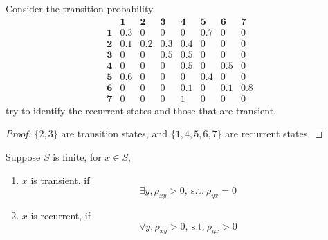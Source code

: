 \begin{example}
	Consider the transition probability,
	\begin{equation*}
		\begin{array}{cccccccc}
			           & \mathbf{1} & \mathbf{2} & \mathbf{3} & \mathbf{4} & \mathbf{5} & \mathbf{6} & \mathbf{7} \\
			\mathbf{1} & 0.3        & 0          & 0          & 0          & 0.7        & 0          & 0          \\
			\mathbf{2} & 0.1        & 0.2        & 0.3        & 0.4        & 0          & 0          & 0          \\
			\mathbf{3} & 0          & 0          & 0.5        & 0.5        & 0          & 0          & 0          \\
			\mathbf{4} & 0          & 0          & 0          & 0.5        & 0          & 0.5        & 0          \\
			\mathbf{5} & 0.6        & 0          & 0          & 0          & 0.4        & 0          & 0          \\
			\mathbf{6} & 0          & 0          & 0          & 0.1        & 0          & 0.1        & 0.8        \\
			\mathbf{7} & 0          & 0          & 0          & 1          & 0          & 0          & 0
		\end{array}
	\end{equation*}
	try to identify the recurrent states and those that are transient.
\end{example}

\begin{proof}
	$\{2,3\}$ are transition states, and $\{1,4,5,6,7\}$ are recurrent states.
\end{proof}

\begin{remark}
	Suppose $S$ is finite, for $x\in S$,
	\begin{enumerate}
		\item $x$ is transient, if
		      \begin{equation*}
			      \exists y,\rho_{xy}>0,\ \text{s.t.}\ \rho_{yx}=0
		      \end{equation*}
		\item $x$ is recurrent, if
		      \begin{equation*}
			      \forall y,\rho_{xy}>0,\ \text{s.t.}\ \rho_{yx}>0
		      \end{equation*}
	\end{enumerate}
\end{remark}

